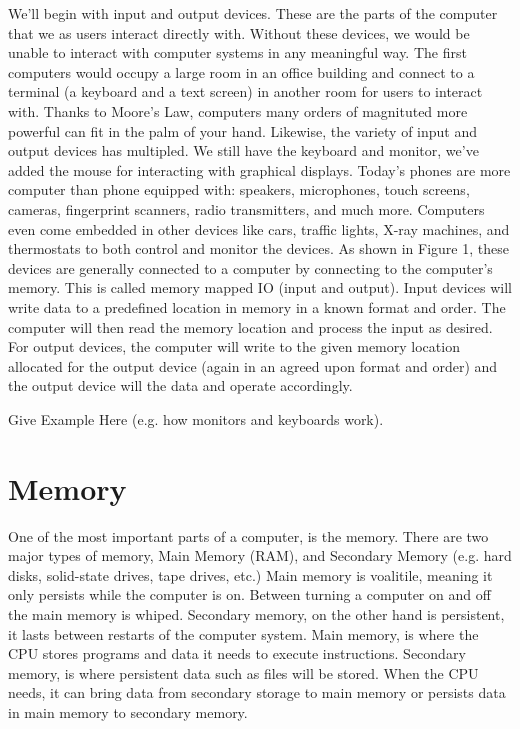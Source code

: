 We'll begin with input and output devices. These are the parts of the
computer that we as users interact directly with. Without these devices,
we would be unable to interact with computer systems in any meaningful
way. The first computers would occupy a large room in an office building
and connect to a terminal (a keyboard and a text screen) in another room
for users to interact with. Thanks to Moore's Law, computers many orders
of magnituted more powerful can fit in the palm of your hand. Likewise,
the variety of input and output devices has multipled. We still have the
keyboard and monitor, we've added the mouse for interacting with graphical
displays. Today's phones are more computer than phone equipped with:
speakers, microphones, touch screens, cameras, fingerprint scanners, radio
transmitters, and much more. Computers even come embedded in other devices
like cars, traffic lights, X-ray machines, and thermostats to both control
and monitor the devices. As shown in Figure 1, these devices are generally
connected to a computer by connecting to the computer's memory. This is
called memory mapped IO (input and output). Input devices will write data
to a predefined location in memory in a known format and order. The
computer will then read the memory location and process the input as
desired. For output devices, the computer will write to the given memory
location allocated for the output device (again in an agreed upon format
and order) and the output device will the data and operate accordingly.

\begin{example}
Give Example Here (e.g. how monitors and keyboards work).
\end{example}

\section{Memory}

One of the most important parts of a computer, is the memory. There are two
major types of memory, Main Memory (RAM), and Secondary Memory (e.g. hard
disks, solid-state drives, tape drives, etc.) Main memory is voalitile,
meaning it only persists while the computer is on. Between turning a computer
on and off the main memory is whiped. Secondary memory, on the other hand
is persistent, it lasts between restarts of the computer system. Main memory,
is where the CPU stores programs and data it needs to execute instructions.
Secondary memory, is where persistent data such as files will be stored. When
the CPU needs, it can bring data from secondary storage to main memory or
persists data in main memory to secondary memory.

